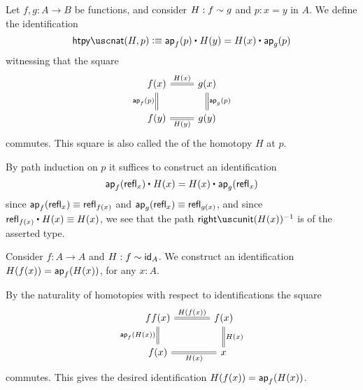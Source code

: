 \begin{defn}\label{defn:htpy_nat}
Let $f,g:A\to B$ be functions, and consider $H:f\htpy g$ and $p:x=y$ in $A$. We define the identification
\begin{equation*}
\htpynat(H,p) \defeq  \ct{\ap{f}{p}}{H(y)}=\ct{H(x)}{\ap{g}{p}}
\end{equation*}
witnessing that the square
\begin{equation*}
\begin{tikzcd}
f(x) \arrow[r,equals,"H(x)"] \arrow[d,equals,swap,"\ap{f}{p}"] & g(x) \arrow[d,equals,"\ap{g}{p}"] \\
f(y) \arrow[r,equals,swap,"H(y)"] & g(y)
\end{tikzcd}
\end{equation*}
commutes. This square is also called the  of the homotopy $H$ at $p$.
\end{defn}

\begin{constr}
  By path induction on $p$ it suffices to construct an identification
  \begin{equation*}
    \ct{\ap{f}{\refl{x}}}{H(x)}=\ct{H(x)}{\ap{g}{\refl{x}}}
  \end{equation*}
  since $\ap{f}{\refl{x}}\jdeq \refl{f(x)}$ and $\ap{g}{\refl{x}}\jdeq\refl{g(x)}$, and since $\ct{\refl{f(x)}}{H(x)}\jdeq H(x)$, we see that the path $\rightunit(H(x))^{-1}$ is of the asserted type.
\end{constr}

\begin{defn}\label{defn:retraction_swap}
Consider $f:A\to A$ and $H: f\htpy \idfunc[A]$. We construct an identification $H(f(x))=\ap{f}{H(x)}$, for any $x:A$.
\end{defn}

\begin{constr}
By the naturality of homotopies with respect to identifications the square
\begin{equation*}
\begin{tikzcd}[column sep=large]
ff(x) \arrow[d,swap,equals,"\ap{f}{H(x)}"] \arrow[r,equals,"H(f(x))"] & f(x) \arrow[d,equals,"H(x)"] \\
f(x) \arrow[r,swap,equals,"H(x)"] & x
\end{tikzcd}
\end{equation*}
commutes. This gives the desired identification $H(f(x))=\ap{f}{H(x)}$.
\end{constr}

